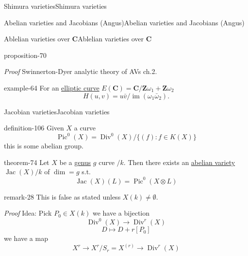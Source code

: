\documentclass[10pt,]{book}
\makeatletter
\renewcommand*{\proofname}{Proof}
\renewenvironment{proof}[1][\proofname]{\par
  \pushQED{\qed}%
  \normalfont \topsep6\p@\@plus6\p@\relax
  \trivlist
  \item\relax
    {\itshape
    #1\@addpunct{.}}\hspace\labelsep\ignorespaces
}{%
  \popQED\endtrivlist\@endpefalse
}
\numberwithin{equation}{section}
\newcommand{\ZZ}{\mathbf{Z}}
\newcommand{\CC}{\mathbf{C}}
\DeclareMathOperator{\divisors}{Div}
\DeclareMathOperator{\Pic}{Pic}
\DeclareMathOperator{\Jac}{Jac}
\DeclareMathOperator{\im}{im}
\makeatother
\begin{document}
\begin{chapterptx}{Shimura varieties}{}{Shimura varieties}{}{}
\begin{sectionptx}{Abelian varieties and Jacobians (Angus)}{}{Abelian varieties and Jacobians (Angus)}{}{}
\begin{subsectionptx}{Ablelian varieties over \(\CC\)}{}{Ablelian varieties over \(\CC\)}{}{}
\begin{proposition}{}{}{proposition-70}
%
\end{proposition}
\begin{proof}\hypertarget{proof-112}{}
\hypertarget{p-1100}{}%
Swinnerton-Dyer analytic theory of AVs ch.2.%
\end{proof}
\begin{example}{}{example-64}%
\hypertarget{p-1101}{}%
For an \hyperref[def-supersing-isog-ec]{elliptic curve} \(E(\CC) = \CC/ \ZZ \omega_1 + \ZZ \omega_2\)%
\begin{equation*}
H(u,v) = u\bar v/ \im(\omega_1 \bar \omega_2)\text{.}
\end{equation*}
%
\end{example}
\end{subsectionptx}
%
%
\typeout{************************************************}
\typeout{************************************************}
%
\begin{subsectionptx}{Jacobian varieties}{}{Jacobian varieties}{}{}\label{subsection-80}
\begin{definition}{}{definition-106}%
\hypertarget{p-1102}{}%
Given \(X\) a curve%
\begin{equation*}
\Pic^0(X) = \divisors^0(X)/\{(f) : f \in K(X)\}
\end{equation*}
this is some abelian group.%
\end{definition}
\begin{theorem}{}{}{theorem-74}%
\hypertarget{p-1103}{}%
Let \(X\) be a \hyperref[def-class-set]{genus} \(g\) curve \(/k\). Then there exists an \hyperref[def-buntes-abvar]{abelian variety} \(\Jac(X)/k\) of \(\dim = g\) s.t.%
\begin{equation*}
\Jac(X)(L) = \Pic^0(X\otimes L)
\end{equation*}
%
\end{theorem}
\begin{remark}{}{remark-28}%
\hypertarget{p-1104}{}%
This is false as stated unless \(X(k) \ne \emptyset\).%
\end{remark}
\begin{proof}\hypertarget{proof-113}{}
\hypertarget{p-1105}{}%
Idea: Pick \(P_0 \in X(k)\) we have a bijection%
\begin{equation*}
\divisors^0(X) \to \divisors^r(X)
\end{equation*}
%
\begin{equation*}
D \mapsto D + r[P_0]
\end{equation*}
we have  a map%
\begin{equation*}
X^r \to X^r/ S_r = X^{(r)} \to \divisors^r(X)

\end{equation*}
\end{proof}
\end{subsectionptx}
\end{sectionptx}
\end{chapterptx}
\end{document}
